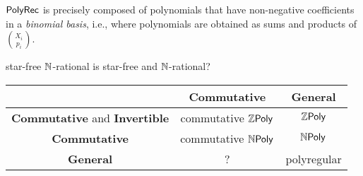 \documentclass[sigconf,natbib=false,screen, review,anonymous]{acmart}
\begin{document}
\begin{conjecture}
    $\mathsf{PolyRec}$ is precisely composed of polynomials that
    have non-negative coefficients in a \emph{binomial basis},
    i.e., where polynomials are obtained
    as sums and products of $\binom{X_i}{p_i}$.
\end{conjecture}

\begin{conjecture}
    star-free $\mathbb{N}$-rational is star-free and $\mathbb{N}$-rational?
\end{conjecture}


\begin{center}
    \begin{tabular}{c|cc}
        \toprule
        & \textbf{Commutative} & \textbf{General} \\
        \midrule
        \textbf{Commutative}
        and \textbf{Invertible} & commutative $\ZPoly$ & $\ZPoly$ \\
        \textbf{Commutative} & commutative $\NPoly$ & $\NPoly$ \\
        \textbf{General} & ? & polyregular 
    \end{tabular}
\end{center}


\printbibliography

\appendix
\end{document}
